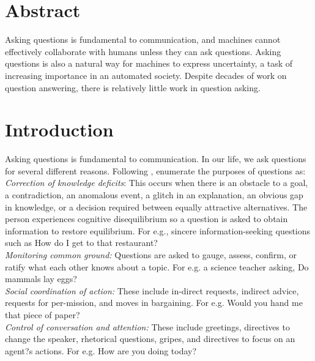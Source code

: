 \documentclass[11pt]{article}
\begin{document}
\section{Abstract}

Asking questions is fundamental to communication, and machines cannot effectively collaborate with humans unless they can ask questions. Asking questions is also a natural way for machines to express uncertainty, a task of increasing importance in an automated society. Despite decades of work on question answering, there is relatively little work in question asking.

\section{Introduction}


Asking questions is fundamental to communication. In our life, we ask questions for several different reasons. Following \cite{graesser1994question}, \cite{graesser2008question}  enumerate the purposes of questions as: 
\textit{Correction of knowledge deficits}: This occurs when there is an obstacle to a goal, a contradiction, an anomalous event, a glitch in an explanation, an obvious gap in knowledge, or a decision required between equally attractive alternatives. The person experiences cognitive disequilibrium so a question is asked to obtain information to restore equilibrium. For e.g., sincere information-seeking questions such as How do I get to that restaurant?\\
\textit{Monitoring common ground:} Questions are asked to gauge, assess, confirm, or ratify what each other knows about a topic. For e.g. a science teacher asking, Do mammals lay eggs?\\
\textit{Social coordination of action:} These include in-direct requests, indirect advice, requests for per-mission, and moves in bargaining. For e.g. Would you hand me that piece of paper?\\
\textit{Control of conversation and attention:} These include greetings, directives to change the speaker, rhetorical questions, gripes, and directives to focus on an agent?s actions. For e.g. How are you doing today?

\end{document}
